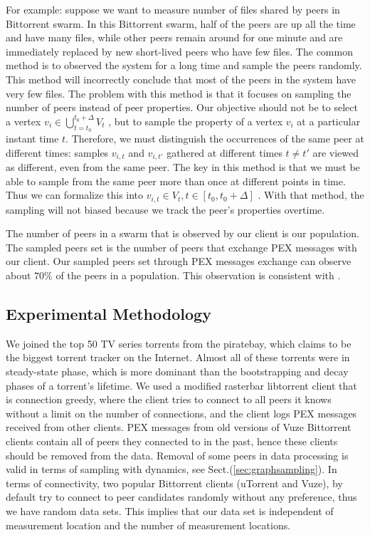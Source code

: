 For example: suppose we want to measure number of files shared by peers in Bittorrent swarm.
In this Bittorrent swarm, half of the peers are up all the time and have many files, while other peers remain around for one minute and are immediately replaced by new short-lived peers who have few files.
The common method is to observed the system for a long time and sample the peers randomly. 
This method will incorrectly conclude that most of the peers in the system have very few files.
The problem with this method is that it focuses on sampling the number of peers instead of peer properties.
Our objective should not be to select a vertex $v_i \in \bigcup^{t_0+\Delta}_{t=t_0} V_t$ , but to sample the property of a vertex $v_i$ at a particular instant time $t$.
Therefore, we must distinguish the occurrences of the same peer at different times: samples $v_{i,t}$ and $v_{i,t'}$ gathered at different times $t \neq t'$ are viewed as different, even from the same peer.
The key in this method is that we must be able to sample from the same peer more than once at different points in time.
Thus we can formalize this into $v_{i,t} \in V_t  , t \in [t_0, t_0 + \Delta]$ \cite{ stutzbach2007sampling}. 
With that method, the sampling will not biased because we track the peer's properties overtime. 

The number of peers in a swarm that is observed by our client is our population. 
The sampled peers set is the number of peers that exchange PEX messages with our client.
Our sampled peers set through PEX messages exchange can observe about $70\%$ of the peers in a population.
This observation is consistent with \cite{wu2010understanding}.

\subsection{Experimental Methodology}
We joined the top 50 TV series torrents from the piratebay, which claims to be the biggest torrent tracker on the Internet.
Almost all of these torrents were in steady-state phase, which is more dominant than the bootstrapping and decay phases of a torrent's lifetime.
We used a modified rasterbar libtorrent \cite{rasterbar} client that is connection greedy, where the client tries to connect to all peers it knows without a limit on the number of connections, and the client logs PEX messages received from other clients.
PEX messages from old versions of Vuze Bittorrent clients contain all of peers they connected to in the past, hence these clients should be removed from the data.
Removal of some peers in data processing is valid in terms of sampling with dynamics, see Sect.(\ref{sec:graphsampling}).
In terms of connectivity, two popular Bittorrent clients (uTorrent and Vuze), by default try to connect to peer candidates randomly without any preference, thus we have random data sets.
This implies that our data set is independent of measurement location and the number of measurement locations.

